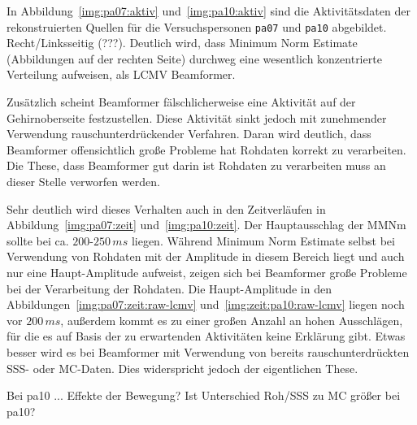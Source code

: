 \documentclass[doc,a4paper,12pt]{apa6}
\begin{document}
In Abbildung~\ref{img:pa07:aktiv} und~\ref{img:pa10:aktiv} sind die Aktivitätsdaten der rekonstruierten Quellen für die Versuchspersonen \texttt{pa07} und \texttt{pa10} abgebildet. Recht/Linksseitig (???). Deutlich wird, dass Minimum Norm Estimate (Abbildungen auf der rechten Seite) durchweg eine wesentlich konzentrierte Verteilung aufweisen, als LCMV Beamformer.


Zusätzlich scheint Beamformer fälschlicherweise eine Aktivität auf der Gehirnoberseite festzustellen. Diese Aktivität sinkt jedoch mit zunehmender Verwendung rauschunterdrückender Verfahren. Daran wird deutlich, dass Beamformer offensichtlich große Probleme hat Rohdaten korrekt zu verarbeiten. Die These, dass Beamformer gut darin ist Rohdaten zu verarbeiten muss an dieser Stelle verworfen werden.


Sehr deutlich wird dieses Verhalten auch in den Zeitverläufen in Abbildung~\ref{img:pa07:zeit} und~\ref{img:pa10:zeit}. Der Hauptausschlag der MMNm sollte bei ca. $200$-$250\,ms$ liegen. Während Minimum Norm Estimate selbst bei Verwendung von Rohdaten mit der Amplitude in diesem Bereich liegt und auch nur eine Haupt-Amplitude aufweist, zeigen sich bei Beamformer große Probleme bei der Verarbeitung der Rohdaten. Die Haupt-Amplitude in den Abbildungen~\ref{img:pa07:zeit:raw-lcmv} und~\ref{img:zeit:pa10:raw-lcmv} liegen noch vor $200\,ms$, außerdem kommt es zu einer großen Anzahl an hohen Ausschlägen, für die es auf Basis der zu erwartenden Aktivitäten keine Erklärung gibt. Etwas besser wird es bei Beamformer mit Verwendung von bereits rauschunterdrückten SSS- oder MC-Daten. Dies widerspricht jedoch der eigentlichen These.

Bei pa10 ... Effekte der Bewegung? Ist Unterschied Roh/SSS zu MC größer bei pa10?

\end{document}
